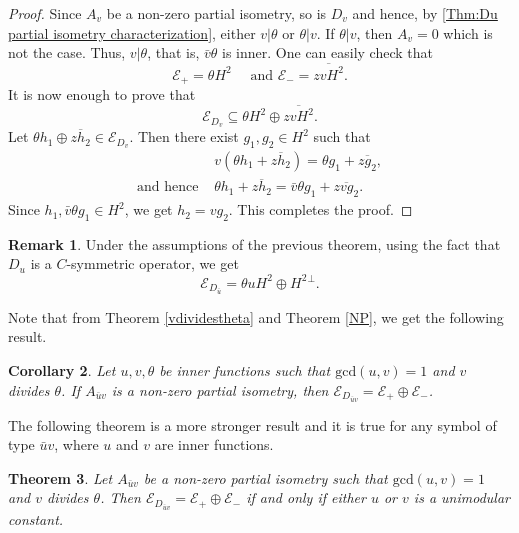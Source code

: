 \documentclass[12pt]{amsart}
\newcommand{\cle}{\mathcal{E}}
\newcommand{\h}{{H}^2}
\theoremstyle{definition}
\theoremstyle{plain}
\newtheorem{thm}{Theorem}[section]
\newtheorem{cor}[thm]{Corollary}
\theoremstyle{definition}
\newtheorem{rem}[thm]{Remark}
\numberwithin{equation}{section}
\begin{document}
	
\begin{proof}		
Since $A_v$ be a non-zero partial isometry, so is $D_v$ and hence, by \ref{Thm:Du partial isometry characterization}, either $v|\theta$ or $\theta |v$. If $\theta |v$, then $A_{v}=0$ which is not the case. Thus, $v|\theta$, that is, $\bar{v}\theta$ is inner. One can easily check that 
		\[
		\cle_{+}=\theta \h \quad \text{ and } \cle_{-}= \overline{zv\h}.
		\]
It is now enough to prove that
		\[
		\cle_{D_{v}}\subseteq \theta\h\oplus \overline{zv\h}.
		\]
Let $ \theta h_1 \oplus \overline{zh_2} \in \cle_{D_{v}}$. Then there exist $g_1,g_2 \in \h$ such that
\begin{align*}
			&v(\theta h_1+\overline{zh_2})=\theta g_1 +\overline{zg_2},\\
\mbox{and hence~}			& \theta h_1+\overline{zh_2}=\bar{v}\theta g_1 +\overline{zvg_2}.
\end{align*} 
Since $h_1, \bar{v}\theta g_1 \in \h$, we get $h_2=vg_2$. This completes the proof.
\end{proof}



	
\begin{rem}\label{Equality}
Under the assumptions of the previous theorem, using the fact that $D_u$ is a $C$-symmetric operator, we get
		\[
		\cle_{D_{\bar{u}}}=\theta u\h \oplus\h{}^\perp.
		\]
\end{rem}
	
Note that from Theorem \ref{vdividestheta} and Theorem \ref{NP}, we get the following result.
	
\begin{cor}
Let $u,v, \theta$ be inner functions such that $\text{gcd}(u, v)=1$ and $v$ divides $\theta$. If $A_{\bar{u}v}$ is a non-zero partial isometry, then $\cle_{D_{\bar{u}v}}=\cle_{+} \oplus \cle_{-}$.
\end{cor}
	
	
The following  theorem is a more stronger result and it is true for any symbol of type 
$\bar{u}v$, where $u$ and $v$ are inner functions.
	
	
\begin{thm}
Let $A_{\bar{u}v}$ be a non-zero partial isometry such that $\text{gcd}(u, v)=1$ and $v$ divides $\theta$. Then $\cle_{D_{\bar{u}v}}=\cle_+ \oplus \cle_-$ if and only if either $u$ or $v$ is a unimodular constant.
\end{thm}
	
	
	
\end{document}
